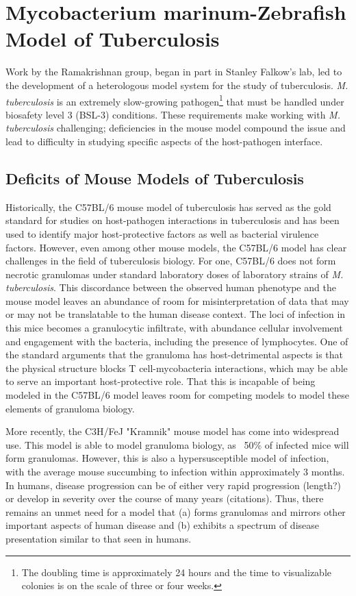 \section{Mycobacterium marinum-Zebrafish Model of Tuberculosis}

Work by the Ramakrishnan group, began in part in Stanley Falkow's lab, led to the development of a heterologous model system for the study of tuberculosis. \textit{M. tuberculosis} is an extremely slow-growing pathogen\footnote{The doubling time is approximately 24 hours and the time to visualizable colonies is on the scale of three or four weeks.} that must be handled under biosafety level 3 (BSL-3) conditions. These requirements make working with \textit{M. tuberculosis} challenging; deficiencies in the mouse model compound the issue and lead to difficulty in studying specific aspects of the host-pathogen interface.

\subsection{Deficits of Mouse Models of Tuberculosis}

Historically, the C57BL/6 mouse model of tuberculosis has served as the gold standard for studies on host-pathogen interactions in tuberculosis and has been used to identify major host-protective factors as well as bacterial virulence factors. However, even among other mouse models, the C57BL/6 model has clear challenges in the field of tuberculosis biology. For one, C57BL/6 does not form necrotic granulomas under standard laboratory doses of laboratory strains of \textit{M. tuberculosis}. This discordance between the observed human phenotype and the mouse model leaves an abundance of room for misinterpretation of data that may or may not be translatable to the human disease context. The loci of infection in this mice becomes a granulocytic infiltrate, with abundance cellular involvement and engagement with the bacteria, including the presence of lymphocytes. One of the standard arguments that the granuloma has host-detrimental aspects is that the physical structure blocks T cell-mycobacteria interactions, which may be able to serve an important host-protective role. That this is incapable of being modeled in the C57BL/6 model leaves room for competing models to model these elements of granuloma biology.

More recently, the C3H/FeJ "Kramnik" mouse model has come into widespread use. This model is able to model granuloma biology, as ~50\% of infected mice will form granulomas. However, this is also a hypersusceptible model of infection, with the average mouse succumbing to infection within approximately 3 months. In humans, disease progression can be of either very rapid progression (length?) or develop in severity over the course of many years (citations). Thus, there remains an unmet need for a model that (a) forms granulomas and mirrors other important aspects of human disease and (b) exhibits a spectrum of disease presentation similar to that seen in humans. 

